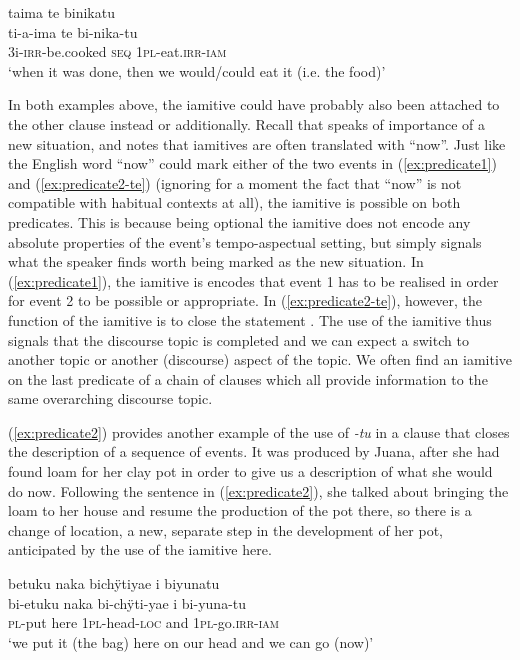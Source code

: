\ea\label{ex:predicate2-te}
\begingl 
\glpreamble taima te binikatu\\
\gla ti-a-ima te bi-nika-tu\\ 
\glb 3i-\textsc{irr}-be.cooked \textsc{seq} 1\textsc{pl}-eat.\textsc{irr}-\textsc{iam}\\ 
\glft ‘when it was done, then we would/could eat it (i.e. the food)’\\ 
\endgl
\trailingcitation{[jxx-d110923l-2.25]}
\xe

In both examples above, the iamitive could have probably also been attached to the other clause instead or additionally. Recall that \citet[]{Ebert2001} speaks of importance of a new situation, and \citet[9]{Olsson2013} notes that iamitives are often translated with “now”. Just like the English word “now” could mark either of the two events in (\ref{ex:predicate1}) and (\ref{ex:predicate2-te}) (ignoring for a moment the fact that “now” is not compatible with habitual contexts at all), the iamitive is possible on both predicates. This is because being optional the iamitive does not encode any absolute properties of the event’s tempo-aspectual setting, but simply signals what the speaker finds worth being marked as the new situation. In (\ref{ex:predicate1}), the iamitive is encodes that event 1 has to be realised in order for event 2 to be possible or appropriate. In (\ref{ex:predicate2-te}), however, the function of the iamitive is to close the statement \citep[cf.][8]{Olsson2013}. The use of the iamitive thus signals that the discourse topic is completed and we can expect a switch to another topic or another (discourse) aspect of the topic. We often find an iamitive on the last predicate of a chain of clauses which all provide information to the same overarching discourse topic. 

(\ref{ex:predicate2}) provides another example of the use of \textit{-tu} in a clause that closes the description of a sequence of events. It was produced by Juana, after she had found loam for her clay pot in order to give us a description of what she would do now. Following the sentence in (\ref{ex:predicate2}), she talked about bringing the loam to her house and resume the production of the pot there, so there is a change of location, a new, separate step in the development of her pot, anticipated by the use of the iamitive here.

\ea\label{ex:predicate2}
\begingl 
\glpreamble betuku naka bichÿtiyae i biyunatu\\
\gla bi-etuku naka bi-chÿti-yae i bi-yuna-tu\\ 
\textsc{pl}-put here 1\textsc{pl}-head-\textsc{loc} and 1\textsc{pl}-go.\textsc{irr}-\textsc{iam}\\ 
\glft ‘we put it (the bag) here on our head and we can go (now)’\\ 
\endgl
\trailingcitation{[jmx-d110918ls-2.02-03]}
\xe

